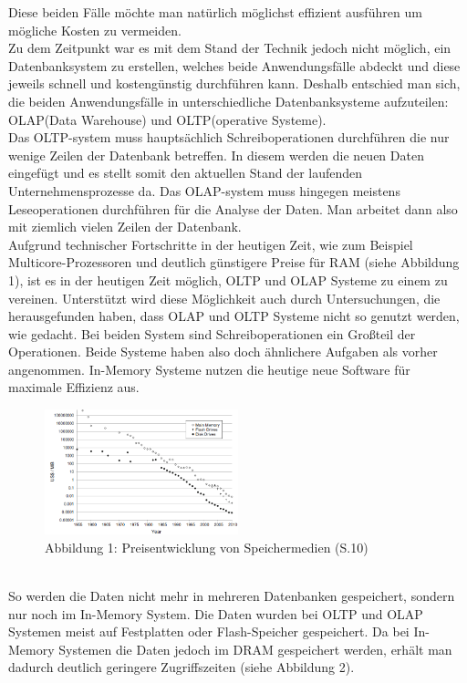 Diese beiden Fälle möchte man natürlich möglichst effizient ausführen um mögliche Kosten zu vermeiden.
\\
Zu dem Zeitpunkt war es mit dem Stand der Technik jedoch nicht möglich, ein Datenbanksystem zu erstellen, welches beide Anwendungsfälle abdeckt und diese jeweils schnell und kostengünstig durchführen kann. Deshalb entschied man sich,
die beiden Anwendungsfälle in unterschiedliche Datenbanksysteme aufzuteilen: OLAP(Data Warehouse) und OLTP(operative Systeme).
\\
Das OLTP-system muss hauptsächlich Schreiboperationen durchführen die nur wenige Zeilen der Datenbank betreffen. In diesem werden die neuen Daten eingefügt und es stellt somit den aktuellen Stand der laufenden Unternehmensprozesse da. Das OLAP-system muss hingegen meistens Leseoperationen durchführen für die Analyse der Daten. Man arbeitet dann also mit ziemlich vielen Zeilen der Datenbank.
\\
Aufgrund technischer Fortschritte in der heutigen Zeit, wie zum Beispiel Multicore-Prozessoren und deutlich günstigere Preise für RAM (siehe Abbildung 1),
ist es in der heutigen Zeit möglich, OLTP und OLAP Systeme zu einem zu vereinen.
Unterstützt wird diese Möglichkeit auch durch Untersuchungen, die herausgefunden haben, dass OLAP und OLTP Systeme nicht so genutzt werden, wie gedacht. Bei beiden System sind Schreiboperationen ein Großteil der Operationen. Beide Systeme haben also doch ähnlichere Aufgaben als vorher angenommen. In-Memory Systeme nutzen die heutige neue Software für maximale Effizienz aus.
\begin{figure}[ht]
  \begin{center}
  \includegraphics[width=0.5\textwidth]{images/mainflashdisk.png}
  \end{center}
  \caption{Abbildung 1: Preisentwicklung von Speichermedien (\cite{hp}S.10)}
  \label{fig_1}
\end{figure} 
\\
So werden die Daten nicht mehr in mehreren Datenbanken gespeichert, sondern nur noch im In-Memory System. Die Daten wurden bei OLTP und OLAP Systemen meist auf Festplatten oder Flash-Speicher gespeichert. Da bei In-Memory Systemen die Daten jedoch im DRAM gespeichert werden, erhält man dadurch deutlich geringere Zugriffszeiten (siehe Abbildung 2).
